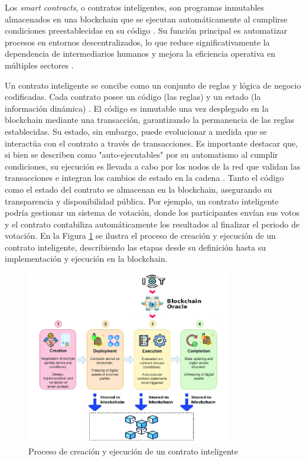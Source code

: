 Los \textit{smart contracts}, o contratos inteligentes, son programas inmutables almacenados en una blockchain que se ejecutan automáticamente al cumplirse condiciones preestablecidas en su código \cite{bulkowska2023implementation}. Su función principal es automatizar procesos en entornos descentralizados, lo que reduce significativamente la dependencia de intermediarios humanos \cite{verma2023overview} y mejora la eficiencia operativa en múltiples sectores \cite{sunny2022systematic}.

Un contrato inteligente se concibe como un conjunto de reglas y lógica de negocio codificadas. Cada contrato posee un código (las reglas) y un estado (la información dinámica) \cite{buterin2013ethereum}. El código es inmutable una vez desplegado en la blockchain mediante una transacción, garantizando la permanencia de las reglas establecidas. Su estado, sin embargo, puede evolucionar a medida que se interactúa con el contrato a través de transacciones. Es importante destacar que, si bien se describen como "auto-ejecutables" por su automatismo al cumplir condiciones, su ejecución es llevada a cabo por los nodos de la red que validan las transacciones e integran los cambios de estado en la cadena \cite{buterin2013ethereum}. Tanto el código como el estado del contrato se almacenan en la blockchain, asegurando su transparencia y disponibilidad pública. Por ejemplo, un contrato inteligente podría gestionar un sistema de votación, donde los participantes envían sus votos y el contrato contabiliza automáticamente los resultados al finalizar el periodo de votación. En la Figura \ref{fig:smart-contract-process} se ilustra el proceso de creación y ejecución de un contrato inteligente, describiendo las etapas desde su definición hasta su implementación y ejecución en la blockchain.

\begin{figure}[!htpb]
    \centering
    \includegraphics[width=0.8\textwidth]{Figures/smart-contract-process.png}
    \caption{Proceso de creación y ejecución de un contrato inteligente}
    \label{fig:smart-contract-process}
\end{figure}

